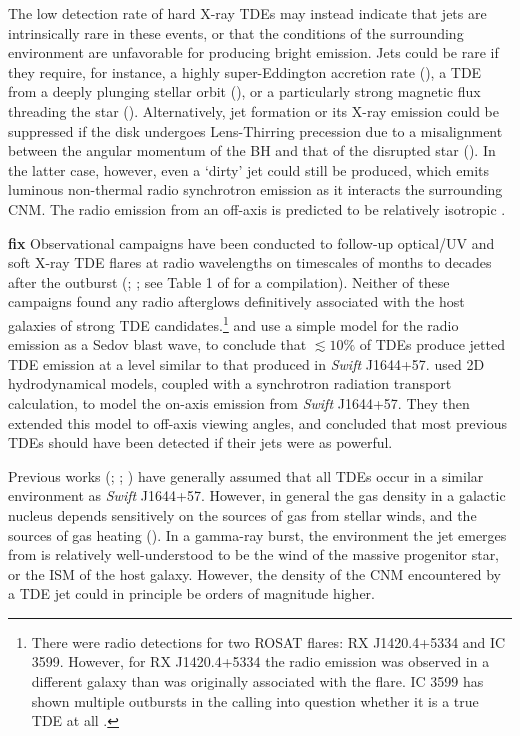 \documentclass[usenatbib,fleqn]{mnras}
\begin{document}
The low detection rate of hard X-ray TDEs may instead indicate that
jets are intrinsically rare in these events, or that the conditions of the
surrounding environment are unfavorable for producing bright emission.
Jets could be rare if they require, for instance, a highly
super-Eddington accretion rate (\citealt{De-Colle+2012}), a TDE from a
deeply plunging stellar orbit (\citealt{Metzger&Stone2015}), or a
particularly strong magnetic flux threading the star
(\citealt{Tchekhovskoy+2014,Kelley+2014}).  Alternatively, jet formation
or its X-ray emission could be suppressed if the disk undergoes
Lens-Thirring precession due to a misalignment between the angular
momentum of the BH and that of the disrupted star
(\citealt{Stone&Loeb2012}).  In the latter case, however, even a `dirty'
jet could still be produced, which emits luminous non-thermal radio
synchrotron emission as it interacts the surrounding CNM.  The radio
emission from an off-axis is predicted to be relatively isotropic
\citep{Giannios&Metzger2011,Mimica+2015}.

{\bf fix} Observational campaigns have been conducted to follow-up
optical/UV and soft X-ray TDE flares at radio wavelengths on
timescales of months to decades after the outburst
(\citealt{Bower+2013}; \citealt{van-Velzen+2013}; see Table 1 of
\citet{Mimica+2015} for a compilation). Neither of these campaigns
found any radio afterglows definitively associated with the host
galaxies of strong TDE candidates.\footnote{There were radio
  detections for two ROSAT flares: RX J1420.4+5334 and IC
  3599. However, for RX J1420.4+5334 the radio emission was observed
  in a different galaxy than was originally associated with the flare.
  IC 3599 has shown multiple outbursts in the calling into question
  whether it is a true TDE at all \citep{Campana+2015}.}
\citet{Bower+2013} and \citet{van-Velzen+2013} use a simple model for
the radio emission as a Sedov blast wave, to conclude that $\lesssim
10\%$ of TDEs produce jetted TDE emission at a level similar to that
produced in {\it Swift} J1644+57.  \citet{Mimica+2015} used 2D
hydrodynamical models, coupled with a synchrotron radiation transport
calculation, to model the on-axis emission from {\it Swift}
J1644+57. They then extended this model to off-axis viewing angles,
and concluded that most previous TDEs should have been detected if
their jets were as powerful.

Previous works (\citet{Bower+2013}; \citet{van-Velzen+2013};
\citealt{Mimica+2015}) have generally assumed that all TDEs occur in a
similar environment as {\it Swift} J1644+57.  However, in general the
gas density in a galactic nucleus depends sensitively on the sources
of gas from stellar winds, and the sources of gas heating
(\citealt{Quataert2004,Generozov+2015}).  In a gamma-ray burst, the
environment the jet emerges from is relatively well-understood to be
the wind of the massive progenitor star, or the ISM of the host
galaxy.  However, the density of the CNM encountered by a TDE jet
could in principle be orders of magnitude higher.
\end{document}
